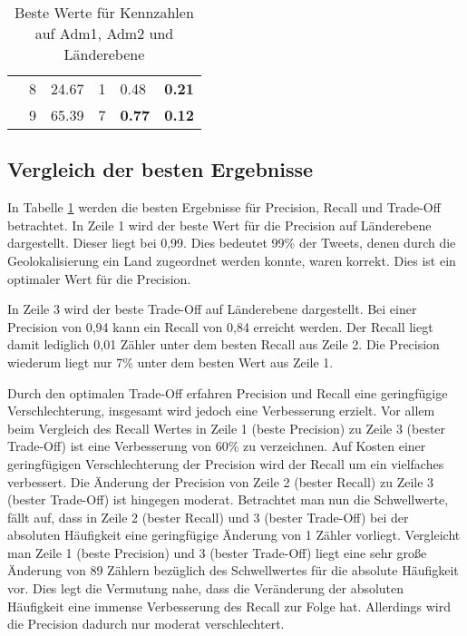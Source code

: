 \begin{table}[h]
\begin{tabular}{|l|l|l|l|l|l|}
			                      & 8 & 24.67                                                                      & 1                                                                         & 0.48          & \textbf{0.21} \\ \cline{2-6} 
			                      & 9 & 65.39                                                                      & 7                                                                         & \textbf{0.77} & \textbf{0.12} \\ \hline
			\end{tabular}
			\caption{Beste Werte für Kennzahlen auf Adm1, Adm2 und Länderebene}
			\label{tab:optAdm1Adm2Co}
			\end{table}

			


		
		\subsection{Vergleich der besten Ergebnisse}

			In Tabelle \ref{tab:optAdm1Adm2Co} werden die besten Ergebnisse für Precision, Recall und Trade-Off betrachtet.
			In Zeile 1 wird der beste Wert für die Precision auf Länderebene dargestellt. 
			Dieser liegt bei 0,99. 
			Dies bedeutet 99\% der Tweets, denen durch die Geolokalisierung ein Land zugeordnet werden konnte, waren korrekt. 
			Dies ist ein optimaler Wert für die Precision.
			
			In Zeile 3 wird der beste Trade-Off auf Länderebene dargestellt.
			Bei einer Precision von 0,94 kann ein Recall von 0,84 erreicht werden. 
			Der Recall liegt damit lediglich 0,01 Zähler unter dem besten Recall aus Zeile 2.
			Die Precision wiederum liegt nur 7\% unter dem besten Wert aus Zeile 1. 
			
			Durch den optimalen Trade-Off erfahren Precision und Recall eine geringfügige Verschlechterung, insgesamt wird jedoch eine Verbesserung erzielt.
			Vor allem beim Vergleich des Recall Wertes in Zeile 1 (beste Precision) zu Zeile 3 (bester Trade-Off) ist eine Verbesserung von 60\% zu verzeichnen.
			Auf Kosten einer geringfügigen Verschlechterung der Precision wird der Recall um ein vielfaches verbessert.
			Die Änderung der Precision von Zeile 2 (bester Recall) zu Zeile 3 (bester Trade-Off) ist hingegen moderat. 
			Betrachtet man nun die Schwellwerte, fällt auf, dass in Zeile 2 (bester Recall) und 3 (bester Trade-Off) bei der absoluten Häufigkeit eine geringfügige Änderung von 1 Zähler vorliegt.
			Vergleicht man Zeile 1 (beste Precision) und 3 (bester Trade-Off) liegt eine sehr große Änderung von 89 Zählern bezüglich des Schwellwertes für die absolute Häufigkeit vor. 
			Dies legt die Vermutung nahe, dass die Veränderung der absoluten Häufigkeit eine immense Verbesserung des Recall zur Folge hat.
			Allerdings wird die Precision dadurch nur moderat verschlechtert. 

